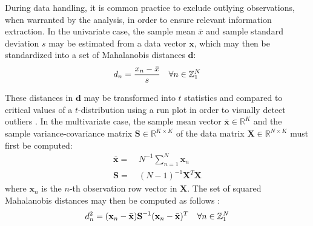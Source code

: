 \begin{doublespace}
During data handling, it is common practice to exclude outlying observations,
when warranted by the analysis, in order to ensure relevant information
extraction. In the univariate case, the sample mean $\bar{x}$ and sample
standard deviation $s$ may be estimated from a data vector $\mathbf{x}$,
which may then be standardized into a set of Mahalanobis distances
$\mathbf{d}$:
\begin{equation}
d_n = \frac{x_n - \bar{x}}{s}
 \quad \forall n \in \mathbb{Z}_{1}^{N}
\end{equation}

These distances in $\mathbf{d}$ may be transformed into $t$ statistics and
compared to critical values of a $t$-distribution using a run plot in order
to visually detect outliers \cite{chambers1983}. In the multivariate case,
the sample mean vector $\bar{\mathbf{x}} \in \mathbb{R}^K$ and the sample
variance-covariance matrix $\mathbf{S} \in \mathbb{R}^{K \times K}$ of the
data matrix $\mathbf{X} \in \mathbb{R}^{N \times K}$ must first be computed:
\begin{align}
\bar{\mathbf{x}} =& \: N^{-1} \sum_{n=1}^N \mathbf{x}_n \\
\mathbf{S} =& \: (N - 1)^{-1} \mathbf{X}^T \mathbf{X}
\end{align}
where $\mathbf{x}_n$ is the $n$-th observation row vector in $\mathbf{X}$.
The set of squared Mahalanobis distances may then be computed as follows
\cite{demaesschalck:cils2000}:
\begin{equation}
d_n^2 =
 (\mathbf{x}_n - \bar{\mathbf{x}}) \mathbf{S}^{-1}
 (\mathbf{x}_n - \bar{\mathbf{x}})^T
 \quad \forall n \in \mathbb{Z}_{1}^{N}
\end{equation}


\end{doublespace}
